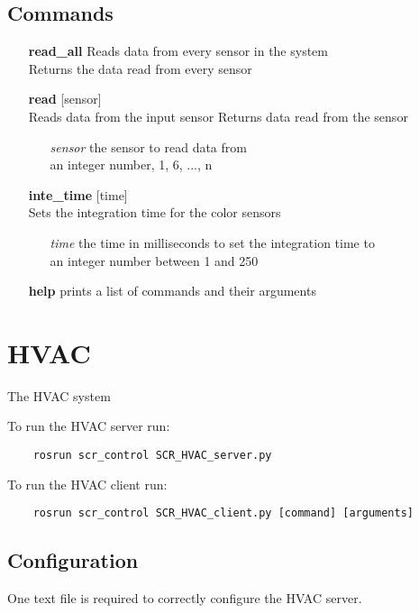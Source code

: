 \documentclass[twoside]{article}
\begin{document}
	\subsection{Commands}
	
	\begin{enumerate}
		\item[\bf read\_all] Reads data from every sensor in the system\\
		Returns the data read from every sensor
		\item[\bf read] [sensor]\\
		Reads data from the input sensor
		Returns data read from the sensor
	
		\begin{enumerate}[leftmargin=3\parindent]
			\item[\it sensor] the sensor to read data from\\
			an integer number, 1, 6, ..., n
		\end{enumerate}
	
	\item[\bf inte\_time] [time]\\
	Sets the integration time for the color sensors
	
	\begin{enumerate}[leftmargin=3\parindent]
		\item[\it time] the time in milliseconds to set the integration time to\\
		an integer number between 1 and 250
	\end{enumerate}
	
		\item[\bf help] prints a list of commands and their arguments
	\end{enumerate}
	
	\section{HVAC}
	The HVAC system 

	To run the HVAC server run:
	\begin{verbatim}
	rosrun scr_control SCR_HVAC_server.py
	\end{verbatim}
	
	To run the HVAC client run:
	\begin{verbatim}
	rosrun scr_control SCR_HVAC_client.py [command] [arguments]
	\end{verbatim}
	
	\subsection{Configuration}
	One text file is required to correctly configure the HVAC server.
	
\end{document}
